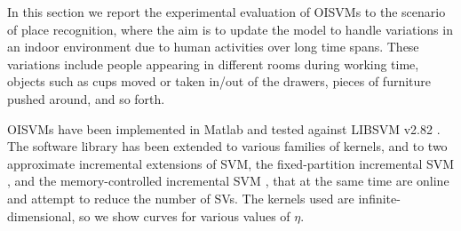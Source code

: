 In this section we report the experimental evaluation of OISVMs
to the scenario of place recognition, where the aim is to update
the model to handle variations in an indoor environment due to
human activities over long time spans.
These variations include people appearing in different rooms during
working time, objects such as cups moved or taken in/out of the drawers,
pieces of furniture pushed around, and so forth.

OISVMs have been implemented in Matlab and tested against LIBSVM v2.82
\cite{ChangL01}. The software library has been extended to various
families of kernels, and to two approximate incremental extensions of
SVM, the fixed-partition incremental SVM \cite{syed99incremental}, and
the memory-controlled incremental SVM \cite{pronobis:icvs06}, that at
the same time are online and attempt to reduce the number of SVs.
The kernels used are infinite-dimensional, so we show curves for various
values of $\eta$.


